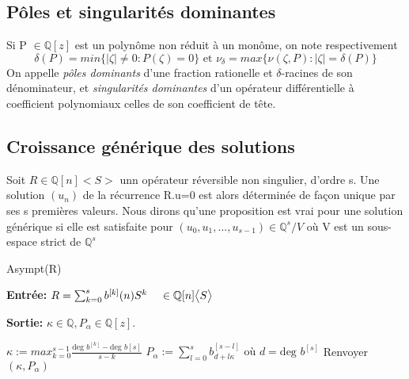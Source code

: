 \documentclass[a4paper,10.5pt]{article}
\begin{document}
	\subsection{Pôles et singularités dominantes}
	
	\begin{definition} Si P $\in \mathbb{Q}[z]$ est un polynôme non réduit à un monôme, on note respectivement
		\[\delta(P)=min\{|\zeta| \neq 0: P(\zeta)=0\} \text{ et } \nu_{\delta}=max\{\nu(\zeta,P):|\zeta|=\delta(P)\}\] 
		On appelle \textit{pôles dominants} d'une fraction rationelle et $\delta$-racines  de son dénominateur, et \textit{singularités dominantes} d'un opérateur différentielle à coefficient polynomiaux celles de son coefficient de tête.  
	\end{definition}
	
	\subsection{Croissance générique des solutions}
	
	\begin{definition} Soit $R \in \mathbb{Q}[n]\big< S\big>$ unn opérateur réversible non singulier, d'ordre s. Une solution $(u_{n})$ de la récurrence R.u=0 est alors déterminée de façon unique par ses s premières valeurs. Nous dirons qu'une proposition est vrai pour une solution générique si elle est satisfaite pour $(u_{0},u_{1},...,u_{s-1}) \in \mathbb{Q}^{s}/V$ où V est un sous-espace strict de $\mathbb{Q}^{s}$
		
	\end{definition}
	
	\begin{algorithm}
		\caption{Asympt(R)}
		
		\vspace{2mm}
		
		\textbf{Entrée:} $R=\sum_{k=0}^{s} b^{[k]}(n)S^{k} \hspace{4mm} \in \mathbb{Q}[n]\big<S\big>$
		
		\textbf{Sortie:} $\kappa \in \mathbb{Q}, P_{\alpha} \in \mathbb{Q}[z].$
		
		\begin{algorithmic}[1]
			\vspace{4mm}
			\STATE $\kappa:= max_{k=0}^{s-1}\frac{\text{deg } b^{[k]}-\text{deg } b{[s]}}{s-k}$
			\vspace{4mm}
			\STATE $P_{\alpha}:=\sum_{l=0}^{s} b_{d+l\kappa}^{[s-l]}\text{ où } d=\text{deg } b^{[s]}$
			\vspace{4mm}
			\STATE Renvoyer $(\kappa,P_{\alpha})$
		\end{algorithmic}
		
	\end{algorithm}
	
\end{document}
